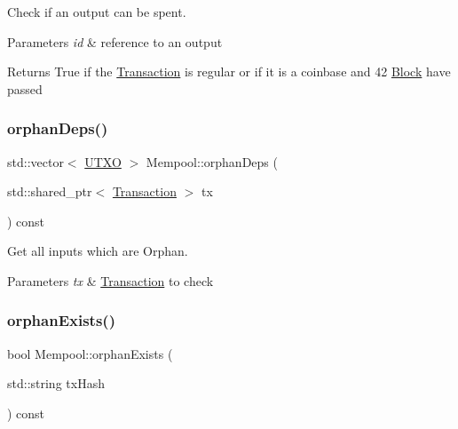 Check if an output can be spent. 


\begin{DoxyParams}{Parameters}
{\em id} & reference to an output \\
\hline
\end{DoxyParams}
\begin{DoxyReturn}{Returns}
True if the \mbox{\hyperlink{classTransaction}{Transaction}} is regular or if it is a coinbase and 42 \mbox{\hyperlink{classBlock}{Block}} have passed 
\end{DoxyReturn}
\mbox{\label{classMempool_a54749b3d653ebd1db396fefb1bfc137c}} 
\subsubsection{\texorpdfstring{orphan\+Deps()}{orphanDeps()}}
{\footnotesize\ttfamily std\+::vector$<$ \mbox{\hyperlink{utxo_8hpp_a19091d002da03ec92277e19295ac4540}{U\+T\+XO}} $>$ Mempool\+::orphan\+Deps (\begin{DoxyParamCaption}\item[{std\+::shared\+\_\+ptr$<$ \mbox{\hyperlink{classTransaction}{Transaction}} $>$}]{tx }\end{DoxyParamCaption}) const}



Get all inputs which are Orphan. 


\begin{DoxyParams}{Parameters}
{\em tx} & \mbox{\hyperlink{classTransaction}{Transaction}} to check \\
\hline
\end{DoxyParams}
\mbox{\label{classMempool_aef85ab57fba69a29f857d805a54a5358}} 
\subsubsection{\texorpdfstring{orphan\+Exists()}{orphanExists()}}
{\footnotesize\ttfamily bool Mempool\+::orphan\+Exists (\begin{DoxyParamCaption}\item[{std\+::string}]{tx\+Hash }\end{DoxyParamCaption}) const}



